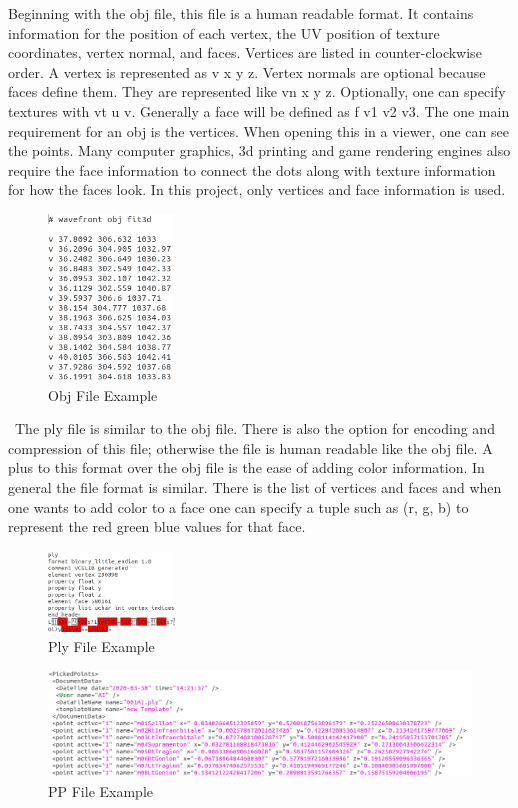 Beginning with the obj file, this file is a human readable format. It contains information for the position of each vertex, the UV position of texture coordinates, vertex normal, and faces. Vertices are listed in counter-clockwise order. A vertex is represented as v x y z. Vertex normals are optional because faces define them. They are represented like vn x y z. Optionally, one can specify textures with vt u v. Generally a face will be defined as f v1 v2 v3. The one main requirement for an obj is the vertices. When opening this in a viewer, one can see the points. Many computer graphics, 3d printing and game rendering engines also require the face information to connect the dots along with texture information for how the faces look. In this project, only vertices and face information is used.
\begin{figure}[h]
	\caption{Obj File Example}
	\centering
	\includegraphics[width=0.3\textwidth]{images/obj_file.png}
\end{figure}
\
The ply file is similar to the obj file. There is also the option for encoding and compression of this file; otherwise the file is human readable like the obj file. A plus to this format over the obj file is the ease of adding color information. In general the file format is similar. There is the list of vertices and faces and when one wants to add color to a face one can specify a tuple such as (r, g, b) to represent the red green blue values for that face. 

\begin{figure}[h]
	\caption{Ply File Example}
	\centering
	\includegraphics[width=0.3\textwidth]{images/ply_file.png}
\end{figure}
\begin{figure}[h]
	\caption{PP File Example}
	\centering
	\includegraphics[width=1.1\textwidth]{images/pp_file.png}
\end{figure}

